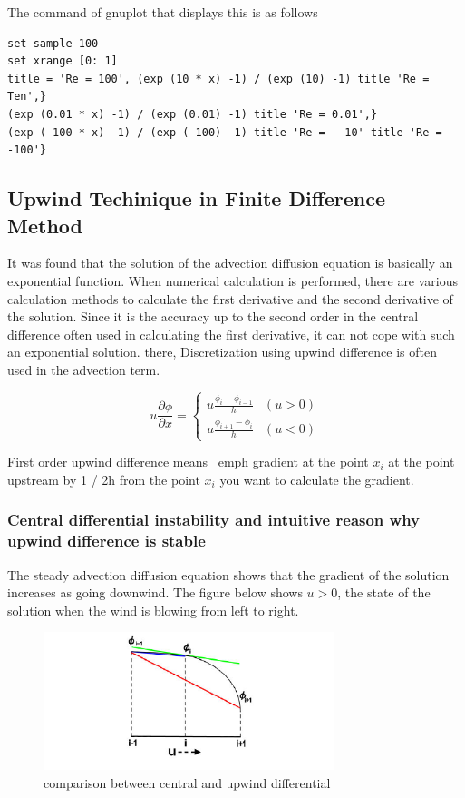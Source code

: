 The command of gnuplot that displays this is as follows

\begin{lstlisting}[caption = gnuplot, label = elem_mat, float, floatplacement = H]
set sample 100
set xrange [0: 1]
title = 'Re = 100', (exp (10 * x) -1) / (exp (10) -1) title 'Re = Ten',}
(exp (0.01 * x) -1) / (exp (0.01) -1) title 'Re = 0.01',}
(exp (-100 * x) -1) / (exp (-100) -1) title 'Re = - 10' title 'Re = -100'}
\end{lstlisting}


\subsection{Upwind Techinique in Finite Difference Method}

It was found that the solution of the advection diffusion equation is basically an exponential function. 
%
When numerical calculation is performed, there are various calculation methods to calculate the first derivative and the second derivative of the solution. 
%
Since it is the accuracy up to the second order in the central difference often used in calculating the first derivative, it can not cope with such an exponential solution. 
%
there, Discretization using upwind difference is often used in the advection term.


\begin{tcolorbox}[title=First order upwind difference method]
\begin{equation}
u\frac{\partial\phi}{\partial x}
=
\left\{\begin{array}{ll}
u\frac{\phi_i-\phi_{i-1}}{h} &  (u>0)\\
u\frac{\phi_{i+1}-\phi_i}{h} & (u<0)
\end{array}\right.
\end{equation}
\end{tcolorbox}

First order upwind difference means \ emph {gradient at the point $x_i$ at the point upstream by 1 / 2h from the point $x_i$ you want to calculate the gradient}.


\subsubsection{Central differential instability and intuitive reason why upwind difference is stable}
The steady advection diffusion equation shows that the gradient of the solution increases as going downwind.
The figure below shows $u>0$, the state of the solution when the wind is blowing from left to right.
%
\begin{figure}[htbp!]
  \centering
  \includegraphics[width=85mm]{images/upwind_central_advec}
  \caption{comparison between central and upwind differential}
  \label{fig:lap_domain}
\end{figure}

